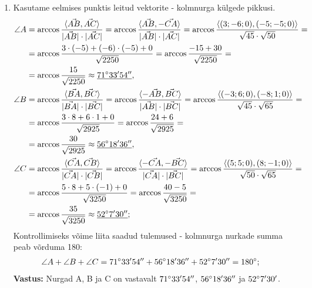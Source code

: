 \documentclass[10pt, a4paper]{article}
\begin{document}
\begin{enumerate}
            \item %
                Kasutame eelmises punktis leitud vektorite - kolmnurga külgede pikkusi.
                \begin{align}
                    \nonumber
                    \angle A &= \arccos \frac{\langle \vec{AB}, \vec{AC} \rangle}{\lvert \vec{AB} \rvert \cdot \lvert \vec{AC} \rvert} 
                        = \arccos \frac{\langle \vec{AB}, -\vec{CA} \rangle}{\lvert \vec{AB} \rvert \cdot \lvert \vec{AC} \rvert} 
                        = \arccos \frac{\langle (3; -6; 0), (-5; -5; 0) \rangle}{\sqrt{45} \cdot \sqrt{50}} = \\ \nonumber
                        &= \arccos \frac{3 \cdot (-5) + (-6) \cdot (-5) + 0}{\sqrt{2250}} =
                        \arccos \frac{-15 + 30}{\sqrt{2250}} =\\ \nonumber
                        &=\arccos \frac{15}{\sqrt{2250}} \approx \underline{71\degree 33' 54''},\\ 
                        \nonumber
                    \angle B &= \arccos \frac{\langle \vec{BA}, \vec{BC} \rangle}{\lvert \vec{BA} \rvert \cdot \lvert \vec{BC} \rvert} 
                        = \arccos \frac{\langle -\vec{AB}, \vec{BC} \rangle}{\lvert \vec{AB} \rvert \cdot \lvert \vec{BC} \rvert} 
                        = \arccos \frac{\langle (-3; 6; 0), (-8; 1; 0) \rangle}{\sqrt{45} \cdot \sqrt{65}} = \\ \nonumber
                        &= \arccos \frac{3 \cdot 8 + 6 \cdot 1 + 0}{\sqrt{2925}} =
                        \arccos \frac{24 + 6}{\sqrt{2925}} =\\ \nonumber
                        &=\arccos \frac{30}{\sqrt{2925}} \approx \underline{56\degree 18' 36''},\\ 
                        \nonumber
                    \angle C &= \arccos \frac{\langle \vec{CA}, \vec{CB} \rangle}{\lvert \vec{CA} \rvert \cdot \lvert \vec{CB} \rvert} 
                        = \arccos \frac{\langle -\vec{CA}, -\vec{BC} \rangle}{\lvert \vec{CA} \rvert \cdot \lvert \vec{BC} \rvert} 
                        = \arccos \frac{\langle (5; 5; 0), (8; -1; 0) \rangle}{\sqrt{50} \cdot \sqrt{65}} = \\ \nonumber
                        &= \arccos \frac{5 \cdot 8 + 5 \cdot (-1) + 0}{\sqrt{3250}} =
                        \arccos \frac{40 - 5}{\sqrt{3250}} =\\ \nonumber
                        &=\arccos \frac{35}{\sqrt{3250}} \approx \underline{52\degree 7' 30''};
                \end{align}
                Kontrollimiseks võime liita saadud tulemused - kolmnurga nurkade summa peab võrduma 180\degree:
                \begin{align}
                    \nonumber
                    \angle A + \angle B + \angle C &= 71\degree 33' 54'' + 56\degree 18' 36'' + 52\degree 7' 30'' = 180\degree;
                \end{align}
                \textbf{Vastus: } Nurgad A, B ja C on vastavalt $71\degree 33' 54''$, $56\degree 18' 36''$ ja $52\degree 7' 30'$.
                

\end{enumerate}
\end{document}
